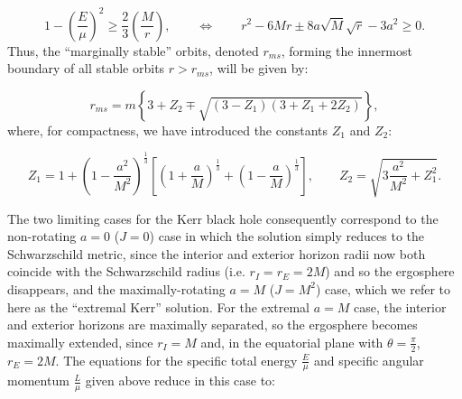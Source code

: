 \documentclass{article}
\begin{document}
\begin{equation}
1 - \left( \frac{E}{\mu} \right)^2 \geq \frac{2}{3} \left( \frac{M}{r} \right), \qquad \iff \qquad r^2 - 6 M r \pm 8 a \sqrt{M} \sqrt{r} - 3 a^2 \geq 0.
\end{equation}
Thus, the ``marginally stable'' orbits, denoted ${r_{ms}}$, forming the innermost boundary of all stable orbits ${r > r_{ms}}$, will be given by:

\begin{equation}
r_{ms} = m \left\lbrace 3 + Z_2 \mp \sqrt{\left( 3 - Z_1 \right) \left( 3 + Z_1 + 2 Z_2 \right)} \right\rbrace,
\end{equation}
where, for compactness, we have introduced the constants ${Z_1}$ and ${Z_2}$:

\begin{equation}
Z_1 = 1 + \left( 1 - \frac{a^2}{M^2} \right)^{\frac{1}{3}} \left[ \left( 1 + \frac{a}{M} \right)^{\frac{1}{3}} + \left( 1 - \frac{a}{M} \right)^{\frac{1}{3}} \right], \qquad Z_2 = \sqrt{3 \frac{a^2}{M^2} + Z_{1}^{2}}.
\end{equation}

The two limiting cases for the Kerr black hole consequently correspond to the non-rotating ${a = 0}$ (${J = 0}$) case in which the solution simply reduces to the Schwarzschild metric, since the interior and exterior horizon radii now both coincide with the Schwarzschild radius (i.e. ${r_I = r_E = 2M}$) and so the ergosphere disappears, and the maximally-rotating ${a = M}$ (${J = M^2}$) case, which we refer to here as the ``extremal Kerr'' solution. For the extremal ${a = M}$ case, the interior and exterior horizons are maximally separated, so the ergosphere becomes maximally extended, since ${r_I = M}$ and, in the equatorial plane with ${\theta = \frac{\pi}{2}}$, ${r_E = 2M}$. The equations for the specific total energy ${\frac{E}{\mu}}$ and specific angular momentum ${\frac{L}{\mu}}$ given above reduce in this case to:
\end{document}
